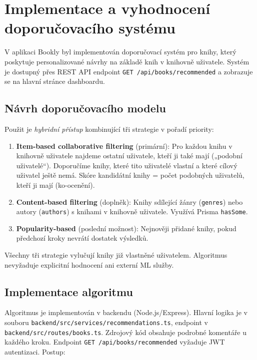 
\section{Implementace a vyhodnocení doporučovacího systému}
V aplikaci Bookly byl implementován doporučovací systém pro knihy, který poskytuje personalizované návrhy na základě knih v knihovně uživatele. Systém je dostupný přes REST API endpoint \texttt{GET /api/books/recommended} a zobrazuje se na hlavní stránce dashboardu.


\subsection{Návrh doporučovacího modelu}
Použit je \emph{hybridní přístup} kombinující tři strategie v pořadí priority:

\begin{enumerate}
  \item \textbf{Item-based collaborative filtering} (primární): Pro každou knihu v knihovně uživatele najdeme ostatní uživatele, kteří ji také mají („podobní uživatelé“). Doporučíme knihy, které tito uživatelé vlastní a které cílový uživatel ještě nemá. Skóre kandidátní knihy = počet podobných uživatelů, kteří ji mají (ko-ocenění).
  \item \textbf{Content-based filtering} (doplněk): Knihy sdílející žánry (\texttt{genres}) nebo autory (\texttt{authors}) s knihami v knihovně uživatele. Využívá Prisma \texttt{hasSome}.
  \item \textbf{Popularity-based} (poslední možnost): Nejnověji přidané knihy, pokud předchozí kroky nevrátí dostatek výsledků.
\end{enumerate}

Všechny tři strategie vylučují knihy již vlastněné uživatelem. Algoritmus nevyžaduje explicitní hodnocení ani externí ML služby.


\subsection{Implementace algoritmu}
Algoritmus je implementován v backendu (Node.js/Express). Hlavní logika je v souboru \texttt{backend/src/services/recommendations.ts}, endpoint v \texttt{backend/src/routes/books.ts}. Zdrojový kód obsahuje podrobné komentáře u každého kroku. Endpoint \texttt{GET /api/books/recommended} vyžaduje JWT autentizaci. Postup:

